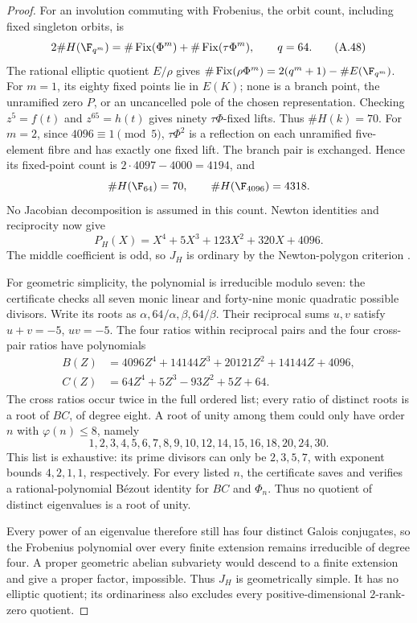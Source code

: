 \begin{proof}
For an involution commuting with Frobenius,
the orbit count, including fixed singleton orbits, is
\[
 2\#H(\F_{q^m})
   =\#\operatorname{Fix}(\Phi^m)
      +\#\operatorname{Fix}(\tau\Phi^m),\qquad q=64.       \tag{A.48}
\]
The rational elliptic quotient $E/\rho$ gives
$\#\operatorname{Fix}(\rho\Phi^m)
 =2(q^m+1)-\#E(\F_{q^m})$.
For $m=1$, its eighty fixed points lie in $E(K)$;
none is a branch point, the unramified zero $P$, or an
uncancelled pole of the chosen representation.
Checking
$z^5=f(t)$ and $z^{65}=h(t)$ gives ninety
$\tau\Phi$-fixed lifts. Thus $\#H(k)=70$.
For $m=2$, since $4096\equiv1\pmod5$,
$\tau\Phi^2$ is a reflection on each unramified
five-element fibre and has exactly one fixed lift.
The branch pair is exchanged. Hence its fixed-point
count is $2\cdot4097-4000=4194$, and
\[
 \#H(\F_{64})=70,\qquad \#H(\F_{4096})=4318.
\]
No Jacobian decomposition is assumed in this count.
Newton identities and reciprocity now give
\[
 P_H(X)=X^4+5X^3+123X^2+320X+4096.                      \tag{A.49}
\]
The middle coefficient is odd, so $J_H$ is ordinary
by the Newton-polygon criterion
\citep[Theorem 2.1 and its proof, p.~1172]
{A_vanBommelCostaLiPoonenSmith2025}.

For geometric simplicity, the polynomial is irreducible
modulo seven: the certificate checks all seven monic
linear and forty-nine monic quadratic possible divisors.
Write its roots as $\alpha,64/\alpha,\beta,64/\beta$.
Their reciprocal sums $u,v$ satisfy
$u+v=-5$, $uv=-5$. The four ratios within reciprocal
pairs and the four cross-pair ratios have polynomials
\[
\begin{aligned}
 B(Z)&=4096Z^4+14144Z^3+20121Z^2+14144Z+4096,\\
 C(Z)&=64Z^4+5Z^3-93Z^2+5Z+64.
\end{aligned}
\]
The cross ratios occur twice in the full ordered list;
every ratio of distinct roots is a root of $BC$, of
degree eight. A root of unity among them could only
have order $n$ with $\varphi(n)\le8$, namely
\[
 1,2,3,4,5,6,7,8,9,10,12,14,15,16,18,20,24,30.
\]
This list is exhaustive: its prime divisors can only
be $2,3,5,7$, with exponent bounds $4,2,1,1$,
respectively. For every listed $n$, the certificate
saves and verifies a rational-polynomial B\'ezout
identity for $BC$ and $\Phi_n$. Thus no quotient of
distinct eigenvalues is a root of unity.

Every power of an eigenvalue therefore still has
four distinct Galois conjugates, so the Frobenius
polynomial over every finite extension remains
irreducible of degree four. A proper geometric
abelian subvariety would descend to a finite
extension and give a proper factor, impossible.
Thus $J_H$ is geometrically simple. It has no
elliptic quotient; its ordinariness also excludes
every positive-dimensional $2$-rank-zero quotient.


\end{proof}
